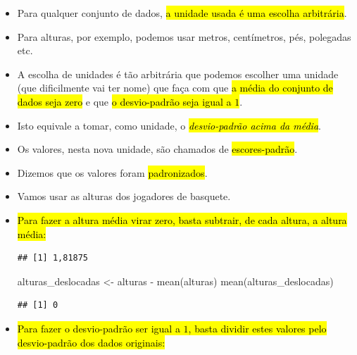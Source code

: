 \documentclass[
  11pt]{report}
\newenvironment{Shaded}{\begin{snugshade}}{\end{snugshade}}
\newcommand{\FunctionTok}[1]{\textcolor[rgb]{0.00,0.00,0.00}{#1}}
\newcommand{\NormalTok}[1]{#1}
\newcommand{\OtherTok}[1]{\textcolor[rgb]{0.56,0.35,0.01}{#1}}
\newcommand{\SpecialCharTok}[1]{\textcolor[rgb]{0.00,0.00,0.00}{#1}}
\renewenvironment{Shaded}{
    \begin{mdframed}[%
      roundcorner=2pt,%
      innerleftmargin=5pt,%
      innerrightmargin=5pt,%
      topline=true,%
      leftline=true,%
      rightline=true,%
      bottomline=true,%
      linewidth=0.5pt,%
      linecolor=black!20,%
      backgroundcolor=black!2,%
      skipabove=2ex,%
      skipbelow=2.5ex%
    ]%
  }
  {
    \end{mdframed}
  }
\begin{document}
\begin{itemize}
\item
  Para qualquer conjunto de dados, {\hl{a unidade usada é uma escolha arbitrária}}.
\item
  Para alturas, por exemplo, podemos usar metros, centímetros, pés, polegadas etc.
\item
  A escolha de unidades é tão arbitrária que podemos escolher uma unidade (que dificilmente vai ter nome) que faça com que {\hl{a média do conjunto de dados seja zero}} e que {\hl{o desvio-padrão seja igual a $1$}}.
\item
  Isto equivale a tomar, como unidade, o {\hl{\emph{desvio-padrão acima da média}}}.
\item
  Os valores, nesta nova unidade, são chamados de {\hl{escores-padrão}}.
\item
  Dizemos que os valores foram {\hl{padronizados}}.
\item
  Vamos usar as alturas dos jogadores de basquete.
\item
  {\hl{Para fazer a altura média virar zero, basta subtrair, de cada altura, a altura média:}}

\begin{Shaded}
\end{Shaded}

\begin{verbatim}
## [1] 1,81875
\end{verbatim}

\begin{Shaded}
\begin{Highlighting}[]
\NormalTok{alturas\_deslocadas }\OtherTok{\textless{}{-}}\NormalTok{ alturas }\SpecialCharTok{{-}} \FunctionTok{mean}\NormalTok{(alturas)}
\FunctionTok{mean}\NormalTok{(alturas\_deslocadas)}
\end{Highlighting}
\end{Shaded}

\begin{verbatim}
## [1] 0
\end{verbatim}
\item
  \protect\hypertarget{dividir-por-sd}{}{} {\hl{Para fazer o desvio-padrão ser igual a $1$, basta dividir estes valores pelo desvio-padrão dos dados originais:}}


\end{itemize}
\end{document}
